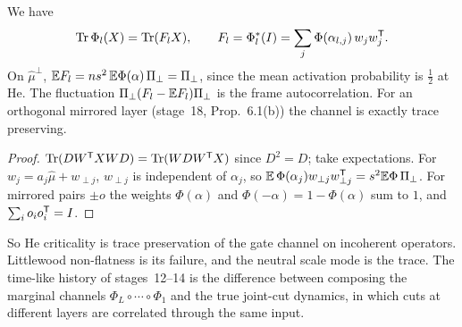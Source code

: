 \begin{proposition}\label{prop:tp}
We have
\[
\operatorname{Tr}\Phi_l(X)=\operatorname{Tr}(F_lX),\qquad F_l=\Phi_l^*(I)=\sum_j\Phi(\alpha_{l,j})\,w_jw_j^{\mathsf T} .
\]
On $\hat\mu^\perp$, $\mathbb{E} F_l=ns^2\,\mathbb{E}\Phi(\alpha)\,\Pi_\perp=\Pi_\perp$, since the mean activation probability is $\tfrac12$ at He. The
fluctuation $\Pi_\perp(F_l-\mathbb{E} F_l)\Pi_\perp$ is the frame autocorrelation. For an orthogonal mirrored layer
(stage~18, Prop.~6.1(b)) the channel is exactly trace preserving.
\end{proposition}
\begin{proof}
$\operatorname{Tr}(DW^{\mathsf T} XWD)=\operatorname{Tr}(W D W^{\mathsf T} X)$ since $D^2=D$; take expectations. For $w_j=a_j\hat\mu+w_{\perp j}$, $w_{\perp j}$ is
independent of $\alpha_j$, so $\mathbb{E}\,\Phi(\alpha_j)w_{\perp j}w_{\perp j}^{\mathsf T}=s^2\mathbb{E}\Phi\,\Pi_\perp$. For mirrored pairs $\pm o$ the
weights $\Phi(\alpha)$ and $\Phi(-\alpha)=1-\Phi(\alpha)$ sum to $1$, and $\sum_io_io_i^{\mathsf T}=I$.
\end{proof}

So He criticality is trace preservation of the gate channel on incoherent operators. Littlewood
non-flatness is its failure, and the neutral scale mode is the trace. The time-like history of
stages~12--14 is the difference between composing the marginal channels $\Phi_L\circ\cdots\circ\Phi_1$ and the true
joint-cut dynamics, in which cuts at different layers are correlated through the same input.

